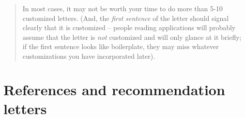 \documentclass{\classes/econtex}
\providecommand\phantomsection{}
\begin{document}
\begin{enumerate}
\begin{quote}
    In most cases, it may not be worth your time to do more than
    5-10 customized letters.  (And, the \textit{first sentence} of the letter should signal
    clearly that it is customized -- people reading applications will probably assume that the letter is \textit{not} customized and will only glance at it briefly; if the first sentence looks like boilerplate, they may miss whatever customizations you have incorporated later).

    \ifdvi\phantomsection\hypertarget{WhatIfEmployerContactsStudent}{}\fi
  \end{quote}
\end{enumerate}

\section*{References and recommendation letters}
\end{document}
